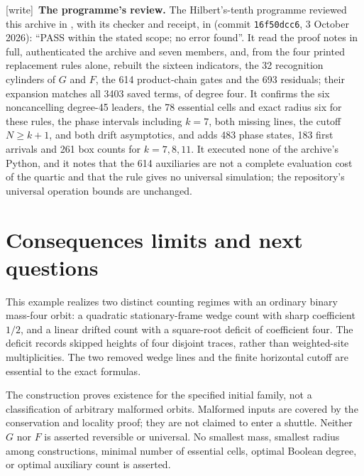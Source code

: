 \documentclass[11pt,letterpaper]{article}
\numberwithin{equation}{section}
\theoremstyle{definition}
\theoremstyle{remark}
\newcommand{\wtag}{\textup{[write]}}
\begin{document}
\wtag\ \textbf{The programme's review.} The Hilbert's-tenth programme reviewed this archive in , with its checker and receipt, in  (commit \texttt{16f50dcc6}, 3 October 2026): ``PASS within the stated scope; no error found''. It read the proof notes in full, authenticated the archive and seven members, and, from the four printed replacement rules alone, rebuilt the sixteen indicators, the 32 recognition cylinders of $G$ and $F$, the 614 product-chain gates and the 693 residuals; their expansion matches all 3403 saved terms, of degree four. It confirms the six noncancelling degree-45 leaders, the 78 essential cells and exact radius six for these rules, the phase intervals including $k=7$, both missing lines, the cutoff $N\ge k+1$, and both drift asymptotics, and adds 483 phase states, 183 first arrivals and 261 box counts for $k=7,8,11$. It executed none of the archive's Python, and it notes that the 614 auxiliaries are not a complete evaluation cost of the quartic and that the rule gives no universal simulation; the repository's universal operation bounds are unchanged.

\section{Consequences limits and next questions}\label{smc:bp:sec:limits}
This example realizes two distinct counting regimes with an ordinary binary mass-four orbit: a quadratic stationary-frame wedge count with sharp coefficient $1/2$, and a linear drifted count with a square-root deficit of coefficient four. The deficit records skipped heights of four disjoint traces, rather than weighted-site multiplicities. The two removed wedge lines and the finite horizontal cutoff are essential to the exact formulas.

The construction proves existence for the specified initial family, not a classification of arbitrary malformed orbits. Malformed inputs are covered by the conservation and locality proof; they are not claimed to enter a shuttle. Neither $G$ nor $F$ is asserted reversible or universal. No smallest mass, smallest radius among constructions, minimal number of essential cells, optimal Boolean degree, or optimal auxiliary count is asserted.
\end{document}
